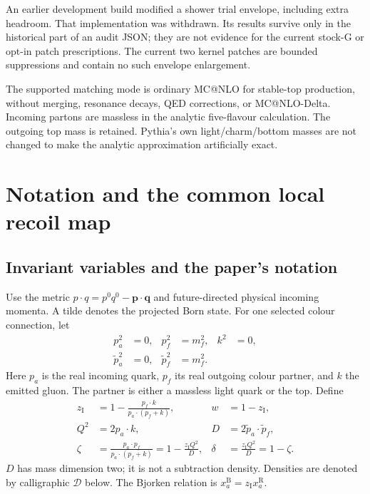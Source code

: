 \documentclass[11pt,a4paper]{article}
\newcommand{\zI}{z_{\mathrm{I}}}
\begin{document}
An earlier development build modified a shower trial envelope, including
extra headroom. That implementation was withdrawn. Its results survive only
in the historical part of an audit JSON; they are not evidence for the
current stock-G or opt-in patch prescriptions. The current two kernel patches
are bounded suppressions and contain no such envelope enlargement.

The supported matching mode is ordinary MC@NLO for stable-top production,
without merging, resonance decays, QED corrections, or MC@NLO-Delta. Incoming
partons are massless in the analytic five-flavour calculation. The outgoing
top mass is retained. Pythia's own light/charm/bottom masses are not changed
to make the analytic approximation artificially exact.

\section{Notation and the common local recoil map}\label{sec:map}

\subsection{Invariant variables and the paper's notation}

Use the metric $p\cdot q=p^0q^0-\boldsymbol p\cdot\boldsymbol q$ and
future-directed physical incoming momenta. A tilde denotes the projected
Born state. For one selected colour connection, let
\begin{align}
 p_a^2&=0,& p_f^2&=m_f^2,& k^2&=0,\\
 \widetilde p_a^2&=0,& \widetilde p_f^2&=m_f^2.
\end{align}
Here $p_a$ is the real incoming quark, $p_f$ its real outgoing colour partner,
and $k$ the emitted gluon. The partner is either a massless light quark or
the top. Define
\begin{align}
 \zI&=1-\frac{p_f\cdot k}{p_a\cdot(p_f+k)},&
 w&=1-\zI,\label{eq:z}\\
 Q^2&=2p_a\cdot k,&
 D&=2\widetilde p_a\cdot\widetilde p_f,\label{eq:QD}\\
 \zeta&=\frac{p_a\cdot p_f}{p_a\cdot(p_f+k)}
       =1-\frac{\zI Q^2}{D},&
 \delta&=\frac{\zI Q^2}{D}=1-\zeta.\label{eq:zeta}
\end{align}
$D$ has mass dimension two; it is not a subtraction density. Densities are
denoted by calligraphic $\mathcal D$ below. The Bjorken relation is
$x_a^{\mathrm B}=\zI x_a^{\mathrm R}$.
\end{document}
